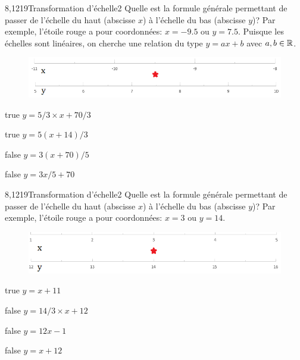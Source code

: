 \documentclass[11pt]{article}
\begin{document}
			\begin{question}{8,1219}{Transformation d'échelle}{2}{}
				Quelle est la formule générale permettant de passer de l'échelle du haut (abscisse $x$) à l'échelle du bas (abscisse $y$)? Par exemple, l'étoile rouge a pour coordonnées: $x=\num{-9.5}$ ou $y=\num{7.5}$. Puisque les échelles sont linéaires, on cherche une relation du type $y = ax+b$ avec $a,b\in\mathbb {R} $.
				\begin{figure}
					\centering
					\includegraphics[scale=.75]{Antoine/Figures_Antoine/lin_-11_-8_to_lin_5_10_star_-9d5_7d5.png}
				\end{figure}
			\end{question}
			\begin{reponses}
				\item[true] $y = 5/3\times x+70/3$
				\item[true] $y = 5(x+14)/3$
				\item[false] $y = 3(x+70)/5$
				\item[false] $y = 3x/5+70$
			\end{reponses}
			
			\begin{question}{8,1219}{Transformation d'échelle}{2}{}
				Quelle est la formule générale permettant de passer de l'échelle du haut (abscisse $x$) à l'échelle du bas (abscisse $y$)? Par exemple, l'étoile rouge a pour coordonnées: $x=3$ ou $y=\num{14}$.
				\begin{figure}
					\centering
					\includegraphics[scale=.75]{Antoine/Figures_Antoine/lin_1_5_to_lin_12_16_star_3_14.png}
				\end{figure}
			\end{question}
			\begin{reponses}
				\item[true] $y = x + 11$
				\item[false] $y = 14/3\times x+12$
				\item[false] $y = 12x-1$
				\item[false] $y = x + 12$
			\end{reponses}
			
\end{document}
